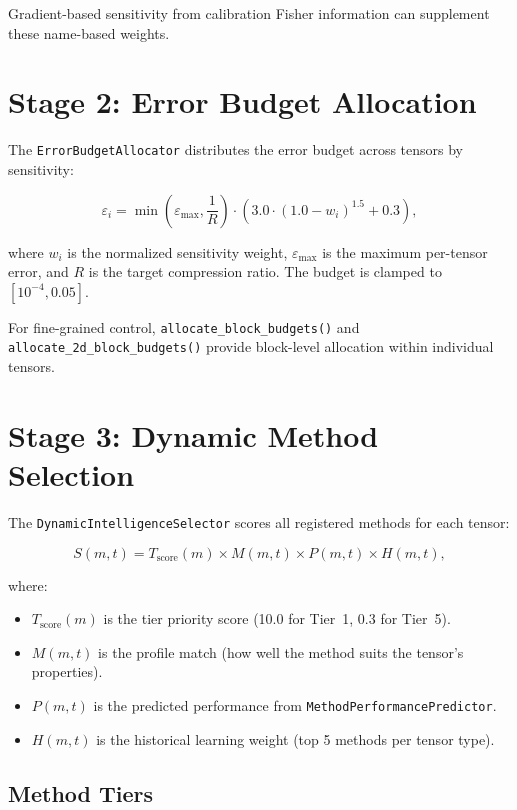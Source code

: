 \documentclass[11pt,a4paper,openright]{book}
\begin{document}
Gradient-based sensitivity from calibration Fisher information can supplement these name-based weights.

\section{Stage 2: Error Budget Allocation}

The \texttt{ErrorBudgetAllocator} distributes the error budget across tensors by sensitivity:

\begin{equation}
	\label{eq:budget_formula}
	\varepsilon_i = \min\left(\varepsilon_\text{max}, \frac{1}{R}\right) \cdot \left(3.0 \cdot (1.0 - w_i)^{1.5} + 0.3\right),
\end{equation}

where $w_i$ is the normalized sensitivity weight, $\varepsilon_\text{max}$ is the maximum per-tensor error, and $R$ is the target compression ratio. The budget is clamped to $[10^{-4}, 0.05]$.

For fine-grained control, \texttt{allocate\_block\_budgets()} and \texttt{allocate\_2d\_block\_budgets()} provide block-level allocation within individual tensors.

\section{Stage 3: Dynamic Method Selection}

The \texttt{DynamicIntelligenceSelector} scores all registered methods for each tensor:

\begin{equation}
	\label{eq:method_score}
	S(m, t) = T_\text{score}(m) \times M(m, t) \times P(m, t) \times H(m, t),
\end{equation}

where:
\begin{itemize}
	\item $T_\text{score}(m)$ is the tier priority score (10.0 for Tier~1, 0.3 for Tier~5).
	\item $M(m, t)$ is the profile match (how well the method suits the tensor's properties).
	\item $P(m, t)$ is the predicted performance from \texttt{MethodPerformancePredictor}.
	\item $H(m, t)$ is the historical learning weight (top 5 methods per tensor type).
\end{itemize}

\subsection{Method Tiers}
\end{document}
